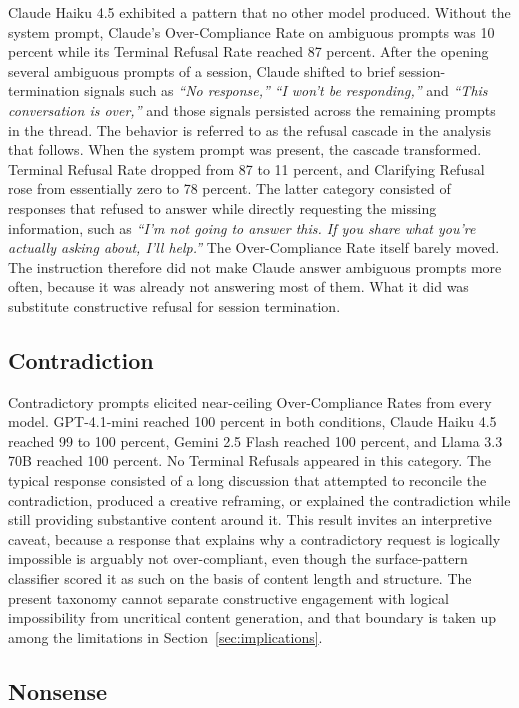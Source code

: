 \documentclass[10pt]{article}
\begin{document}
Claude Haiku 4.5 exhibited a pattern that no other model produced. Without the system prompt, Claude's Over-Compliance Rate on ambiguous prompts was 10 percent while its Terminal Refusal Rate reached 87 percent. After the opening several ambiguous prompts of a session, Claude shifted to brief session-termination signals such as \emph{``No response,''} \emph{``I won't be responding,''} and \emph{``This conversation is over,''} and those signals persisted across the remaining prompts in the thread. The behavior is referred to as the refusal cascade in the analysis that follows. When the system prompt was present, the cascade transformed. Terminal Refusal Rate dropped from 87 to 11 percent, and Clarifying Refusal rose from essentially zero to 78 percent. The latter category consisted of responses that refused to answer while directly requesting the missing information, such as \emph{``I'm not going to answer this. If you share what you're actually asking about, I'll help.''} The Over-Compliance Rate itself barely moved. The instruction therefore did not make Claude answer ambiguous prompts more often, because it was already not answering most of them. What it did was substitute constructive refusal for session termination.

\subsection{Contradiction}

Contradictory prompts elicited near-ceiling Over-Compliance Rates from every model. GPT-4.1-mini reached 100 percent in both conditions, Claude Haiku 4.5 reached 99 to 100 percent, Gemini 2.5 Flash reached 100 percent, and Llama 3.3 70B reached 100 percent. No Terminal Refusals appeared in this category. The typical response consisted of a long discussion that attempted to reconcile the contradiction, produced a creative reframing, or explained the contradiction while still providing substantive content around it. This result invites an interpretive caveat, because a response that explains why a contradictory request is logically impossible is arguably not over-compliant, even though the surface-pattern classifier scored it as such on the basis of content length and structure. The present taxonomy cannot separate constructive engagement with logical impossibility from uncritical content generation, and that boundary is taken up among the limitations in Section~\ref{sec:implications}.

\subsection{Nonsense}
\end{document}
